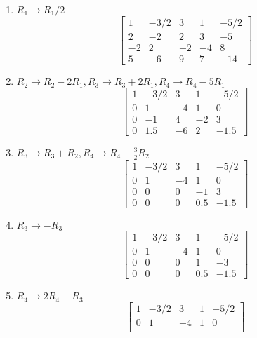 \documentclass{article}
\begin{document}
\begin{enumerate}[(Step 1)]
    \item $R_1 \to R_1/2$
          \[
              \begin{bmatrix}
                  1  & -3/2 & 3  & 1  & -5/2 \\
                  2  & -2   & 2  & 3  & -5   \\
                  -2 & 2    & -2 & -4 & 8    \\
                  5  & -6   & 9  & 7  & -14
              \end{bmatrix}
          \]
    \item $R_2 \to R_2 - 2R_1,  R_3 \to R_3 + 2R_1, R_4 \to R_4 - 5R_1$
          \[
              \begin{bmatrix}
                  1 & -3/2 & 3  & 1  & -5/2 \\
                  0 & 1    & -4 & 1  & 0    \\
                  0 & -1   & 4  & -2 & 3    \\
                  0 & 1.5  & -6 & 2  & -1.5
              \end{bmatrix}
          \]
    \item $R_3 \to R_3 + R_2, R_4 \to R_4 - \frac{3}{2}R_2$
          \[
              \begin{bmatrix}
                  1 & -3/2 & 3  & 1   & -5/2 \\
                  0 & 1    & -4 & 1   & 0    \\
                  0 & 0    & 0  & -1  & 3    \\
                  0 & 0    & 0  & 0.5 & -1.5
              \end{bmatrix}
          \]
    \item $R_3 \to -R_3$
          \[
              \begin{bmatrix}
                  1 & -3/2 & 3  & 1   & -5/2 \\
                  0 & 1    & -4 & 1   & 0    \\
                  0 & 0    & 0  & 1   & -3   \\
                  0 & 0    & 0  & 0.5 & -1.5
              \end{bmatrix}
          \]
    \item $R_4 \to 2R_4-R_3$
          \[
              \begin{bmatrix}
                  1 & -3/2 & 3  & 1 & -5/2 \\
                  0 & 1    & -4 & 1 & 0    \\

\end{bmatrix}\]
\end{enumerate}
\end{document}
